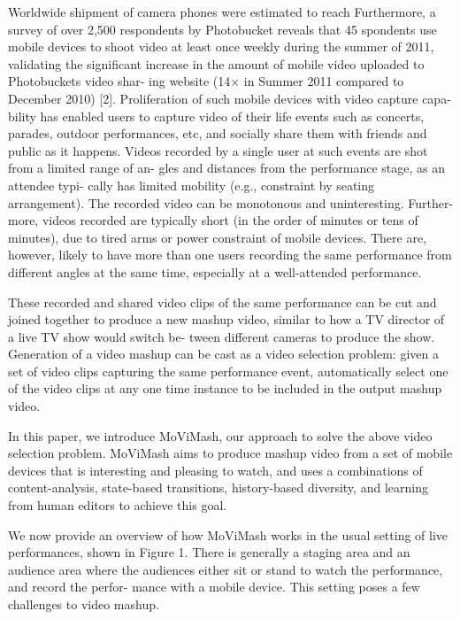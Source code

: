 \documentclass{sig-alternate}
\begin{document}
Worldwide shipment of camera phones were estimated to reach
 Furthermore, a survey of
over 2,500 respondents by Photobucket reveals that 45%
spondents use mobile devices to shoot video at least once weekly during the summer of 2011, validating the significant increase in
the amount of mobile video uploaded to Photobuckets video shar-
ing website (14× in Summer 2011 compared to December 2010) [2].
Proliferation of such mobile devices with video capture capa-
bility has enabled users to capture video of their life events such
as concerts, parades, outdoor performances, etc, and socially share
them with friends and public as it happens. Videos recorded by
a single user at such events are shot from a limited range of an-
gles and distances from the performance stage, as an attendee typi-
cally has limited mobility (e.g., constraint by seating arrangement).
The recorded video can be monotonous and uninteresting. Further-
more, videos recorded are typically short (in the order of minutes
or tens of minutes), due to tired arms or power constraint of mobile
devices. There are, however, likely to have more than one users
recording the same performance from different angles at the same
time, especially at a well-attended performance.\par
These recorded and shared video clips of the same performance
can be cut and joined together to produce a new mashup video,
similar to how a TV director of a live TV show would switch be-
tween different cameras to produce the show. Generation of a video
mashup can be cast as a video selection problem: given a set of
video clips capturing the same performance event, automatically
select one of the video clips at any one time instance to be included
in the output mashup video.\par
In this paper, we introduce MoViMash, our approach to solve
the above video selection problem. MoViMash aims to produce
mashup video from a set of mobile devices that is interesting and
pleasing to watch, and uses a combinations of content-analysis,
state-based transitions, history-based diversity, and learning from
human editors to achieve this goal.\par
We now provide an overview of how MoViMash works in the
usual setting of live performances, shown in Figure 1. There is
generally a staging area and an audience area where the audiences
either sit or stand to watch the performance, and record the perfor-
mance with a mobile device. This setting poses a few challenges to
video mashup.\par
\end{document}
